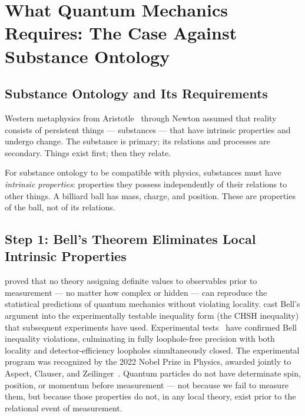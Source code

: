 
\section{What Quantum Mechanics Requires: The Case Against Substance Ontology}
\label{sec:substance}

\subsection{Substance Ontology and Its Requirements}

Western metaphysics from Aristotle~\citeyearpar{Aristotle_Metaphysics} through
Newton assumed that reality consists of persistent things --- substances ---
that have intrinsic properties and undergo change.
The substance is primary; its relations and processes are secondary.
Things exist first; then they relate.

For substance ontology to be compatible with physics, substances must have
\emph{intrinsic properties}: properties they possess independently of their
relations to other things.
A billiard ball has mass, charge, and position.
These are properties of the ball, not of its relations.

\subsection{Step 1: Bell's Theorem Eliminates Local Intrinsic Properties}

\citet{Bell1964} proved that no theory assigning definite values to
observables prior to measurement --- no matter how complex or hidden ---
can reproduce the statistical predictions of quantum mechanics without
violating locality.
\citet{CHSH1969} cast Bell's argument into the experimentally testable
inequality form (the CHSH inequality) that subsequent experiments have
used.
Experimental tests~\citep{Aspect1982,Hensen2015,Giustina2015,Shalm2015}
have confirmed Bell inequality violations, culminating in fully loophole-free
precision with both locality and detector-efficiency loopholes simultaneously closed.
The experimental program was recognized by the 2022 Nobel Prize in Physics,
awarded jointly to Aspect, Clauser, and Zeilinger~\citep{Zeilinger2023Nobel}.
Quantum particles do not have determinate spin, position, or momentum
before measurement --- not because we fail to measure them, but because
those properties do not, in any local theory, exist prior to the relational event of measurement.

